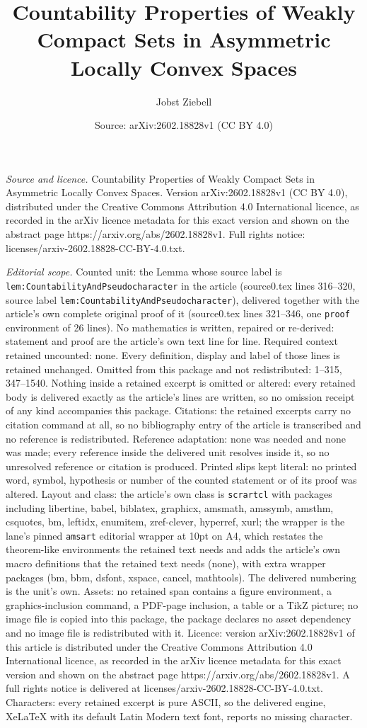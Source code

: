 \documentclass[10pt,a4paper]{amsart}
\title[Countability Properties of Weakly Compact Sets in Asymmetric]{Countability Properties of Weakly Compact Sets in Asymmetric Locally Convex Spaces}
\author{Jobst Ziebell}
\date{Source: arXiv:2602.18828v1 (CC BY 4.0)}
\begin{document}
\maketitle

\noindent\emph{Source and licence.} Countability Properties of Weakly Compact Sets in Asymmetric Locally Convex Spaces. Version arXiv:2602.18828v1 (CC BY 4.0), distributed under the Creative Commons Attribution 4.0 International licence, as recorded in the arXiv licence metadata for this exact version and shown on the abstract page https://arxiv.org/abs/2602.18828v1. Full rights notice: licenses/arxiv-2602.18828-CC-BY-4.0.txt.\par\smallskip

\noindent\textit{Editorial scope.} Counted unit: the Lemma whose source label is \texttt{lem:CountabilityAndPseudocharacter} in the article (source0.tex lines 316--320, source label \texttt{lem:CountabilityAndPseudocharacter}), delivered together with the article's own complete original proof of it (source0.tex lines 321--346, one \texttt{proof} environment of 26 lines). No mathematics is written, repaired or re-derived: statement and proof are the article's own text line for line. Required context retained uncounted: none. Every definition, display and label of those lines is retained unchanged. Omitted from this package and not redistributed: 1--315, 347--1540. Nothing inside a retained excerpt is omitted or altered: every retained body is delivered exactly as the article's lines are written, so no omission receipt of any kind accompanies this package. Citations: the retained excerpts carry no citation command at all, so no bibliography entry of the article is transcribed and no reference is redistributed. Reference adaptation: none was needed and none was made; every reference inside the delivered unit resolves inside it, so no unresolved reference or citation is produced. Printed slips kept literal: no printed word, symbol, hypothesis or number of the counted statement or of its proof was altered. Layout and class: the article's own class is \texttt{scrartcl} with packages including libertine, babel, biblatex, graphicx, amsmath, amssymb, amsthm, csquotes, bm, leftidx, enumitem, zref-clever, hyperref, xurl; the wrapper is the lane's pinned \texttt{amsart} editorial wrapper at 10pt on A4, which restates the theorem-like environments the retained text needs and adds the article's own macro definitions that the retained text needs (none), with extra wrapper packages (bm, bbm, dsfont, xspace, cancel, mathtools). The delivered numbering is the unit's own. Assets: no retained span contains a figure environment, a graphics-inclusion command, a PDF-page inclusion, a table or a TikZ picture; no image file is copied into this package, the package declares no asset dependency and no image file is redistributed with it. Licence: version arXiv:2602.18828v1 of this article is distributed under the Creative Commons Attribution 4.0 International licence, as recorded in the arXiv licence metadata for this exact version and shown on the abstract page https://arxiv.org/abs/2602.18828v1. A full rights notice is delivered at licenses/arxiv-2602.18828-CC-BY-4.0.txt. Characters: every retained excerpt is pure ASCII, so the delivered engine, XeLaTeX with its default Latin Modern text font, reports no missing character.
\end{document}
